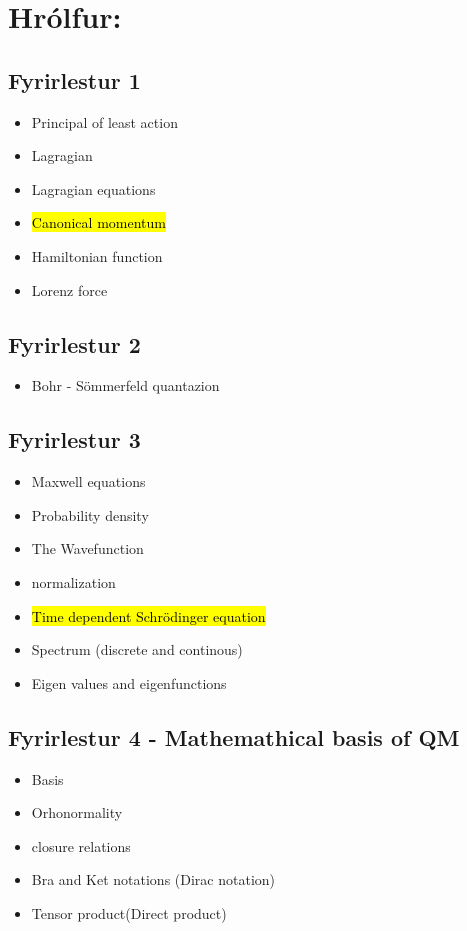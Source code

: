\section*{Hrólfur:}

\subsection{Fyrirlestur 1}
\begin{itemize}
\item Principal of least action
\item Lagragian
\item Lagragian equations
\item \hl{Canonical momentum}
\item Hamiltonian function
\item Lorenz force
\end{itemize}

\subsection{Fyrirlestur 2}
\begin{itemize}
\item Bohr - Sömmerfeld quantazion
\end{itemize}

\subsection{Fyrirlestur 3}
\begin{itemize}
\item Maxwell equations
\item Probability density
\item The Wavefunction
\item normalization
\item \hl{Time dependent Schrödinger equation}
\item Spectrum (discrete and continous)
\item Eigen values and eigenfunctions 
\end{itemize}

\subsection{Fyrirlestur 4 - Mathemathical basis of QM}
\begin{itemize}
\item Basis 
\item Orhonormality
\item closure relations
\item Bra and Ket notations (Dirac notation)
\item Tensor product(Direct product)
\end{itemize}
